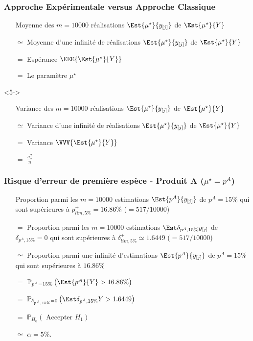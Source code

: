 \documentclass[11pt]{beamer}
\newcommand{\Sim}{{\star}}
\begin{document}
\begin{frame}
\frametitle{Approche Expérimentale versus Approche Classique}
\begin{exampleblock}{}
\begin{itemize}[<+-| alert@+>]
\item[] Moyenne des $m=10000$  réalisations $\Est{\mu^\Sim}{y_{[j]}}$ de $\Est{\mu^\Sim}{Y}$
\item[$\simeq$]  Moyenne d'une infinité de  réalisations $\Est{\mu^\Sim}{y_{[j]}}$ de $\Est{\mu^\Sim}{Y}$
\item[$=$] Espérance $\EEE{\Est{\mu^\Sim}{Y}}$
\item[$=$] Le paramètre $\mu^\Sim$
\end{itemize}
\end{exampleblock}

\begin{exampleblock}<5->{}
\begin{itemize}[<+-| alert@+>]
\item[] Variance des $m=10000$  réalisations $\Est{\mu^\Sim}{y_{[j]}}$ de $\Est{\mu^\Sim}{Y}$
\item[$\simeq$]  Variance d'une infinité de  réalisations $\Est{\mu^\Sim}{y_{[j]}}$ de $\Est{\mu^\Sim}{Y}$
\item[$=$] Variance $\VVV{\Est{\mu^\Sim}{Y}}$
\item[$=$] $\frac{\sigma^2_\Sim}{n}$
\end{itemize}
\end{exampleblock}
\end{frame}

\begin{frame}
\frametitle{Risque d'erreur de première espèce - Produit A ($\mu^\Sim=p^A$)}
\begin{exampleblock}{}
\begin{itemize}[<+-| alert@+>]
\item[] Proportion parmi les $m=10000$  estimations $\Est{p^A}{y_{[j]}}$ de $p^A=15\%$ qui sont supérieures à $p_{lim,5\%}^+=16.86\%$ ($=517/10000$)
\item[$=$] Proportion parmi les $m=10000$  estimations $\Est{\delta_{p^A,15\%}}{y_{[j]}}$ de $\delta_{p^A,15\%}=0$ qui sont supérieures à $\delta_{lim,5\%}^+\simeq 1.6449$ ($=517/10000$)
\item[$\simeq$] Proportion parmi une infinité d'estimations $\Est{p^A}{y_{[j]}}$ de $p^A=15\%$  qui sont supérieures à $16.86\%$
\item[$=$] $\mathbb{P}_{p^A=15\%} \left( \Est{p^A}{Y} > 16.86\%\right)$
\item[$=$] $\mathbb{P}_{\delta_{p^A,15\%}=0} \left( \Est{\delta_{p^A,15\%}}{Y} > 1.6449\right)$
\item[$=$] $\mathbb{P}_{H_0} \left( \mbox{ Accepter } H_1\right)$
\item[$\simeq$] $\alpha=5\%$.
\end{itemize}
\end{exampleblock}

\end{frame}
\end{document}
